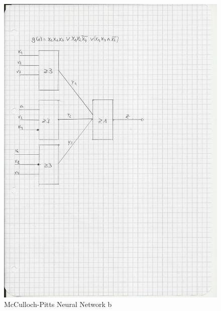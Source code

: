 \documentclass{scrartcl}
\begin{document}
\begin{figure}[ht]
\begin{center}
\includegraphics[scale=0.3]{Attachment2.jpg}
\end{center}
\caption{McCulloch-Pitts Neural Network b}
\label{Img:McCulloch-Pitts b}
\end{figure}
\end{document}
